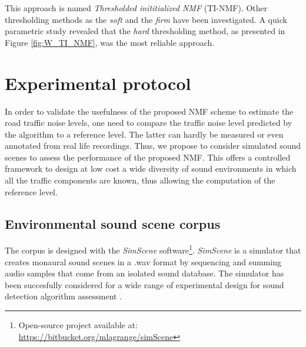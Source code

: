 \documentclass[twocolumn]{svjour3}          %
\begin{document}
This approach is named \textit{Thresholded inititialized NMF} (TI-NMF). Other thresholding methods as the \textit{soft} \cite{donoho1995noising} and the \textit{firm} \cite{fornasier2008iterative} have been investigated. A quick parametric study revealed that the \textit{hard} thresholding method, as presented in  Figure \ref{fig:W_TI_NMF}, was the most reliable approach.

\section{Experimental protocol}\label{part:protocol}

In order to validate the usefulness of the proposed NMF scheme to estimate the road traffic noise levels, one need to compare the traffic noise level predicted by the algorithm to a reference level. The latter can hardly be measured or even annotated from real life recordings. Thus,  we propose to consider simulated sound scenes to assess the performance of the proposed NMF. This offers a controlled framework to design at low cost a wide diversity of sound environments in which all the traffic components are known, thus allowing the computation of the reference level.

\subsection{Environmental sound scene corpus}

The corpus is designed with the \textit{SimScene} software\footnote{Open-source project available at: \url{https://bitbucket.org/mlagrange/simScene}}. \textit{SimScene} \cite{rossignol_simscene:_2015} is a simulator that creates monaural sound scenes in a .wav format by sequencing and summing audio samples that come from an isolated sound database. The simulator has been succesfully considered for a wide range of experimental design for sound detection algorithm assessment \cite{lafay:hal-01111381} \cite{benetos:hal-01520194} \cite{mesaros:hal-01650601}.
\end{document}

